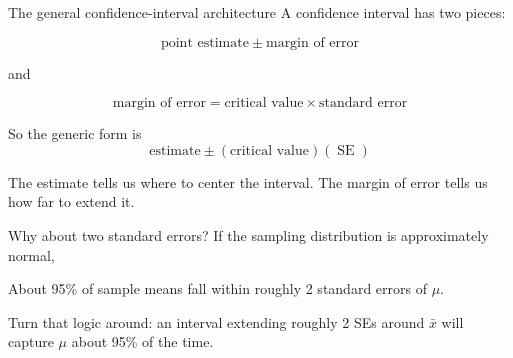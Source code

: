 \documentclass[11pt,aspectratio=169]{beamer}
\newcommand{\SE}{\operatorname{SE}}
\begin{document}
\begin{frame}{The general confidence-interval architecture}
A confidence interval has two pieces:

\[
\boxed{\text{point estimate} \ \pm\ \text{margin of error}}
\]

and

\[
\boxed{\text{margin of error}=\text{critical value}\times\text{standard error}}
\]

So the generic form is
\[
\boxed{\text{estimate}\pm(\text{critical value})(\SE)}
\]

\vfill
\alert{The estimate tells us where to center the interval. The margin of error tells us how far to extend it.}
\end{frame}

\begin{frame}{Why about two standard errors?}
If the sampling distribution is approximately normal,

\begin{center}
\end{center}

About 95\% of sample means fall within roughly 2 standard errors of $\mu$.

\vfill
Turn that logic around: an interval extending roughly 2 SEs around $\bar{x}$ will capture $\mu$ about 95\% of the time.
\end{frame}
\end{document}
